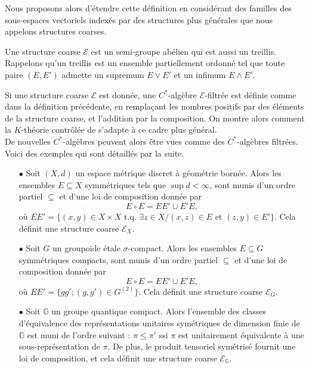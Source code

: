 Nous proposons alors d'étendre cette définition en considérant des familles des sous-espaces vectoriels indexés par des structures plus générales que nous appelons structures coarses. 

\begin{definitionfr}
Une structure coarse $\mathcal E$ est un semi-groupe abélien qui est aussi un treillis. %
Rappelons qu'un treillis est un ensemble partiellement ordonné tel que toute paire $(E,E')$ admette un supremum $E\vee E'$ et un infimum $E\wedge E'$.
\end{definitionfr}

Si une structure coarse $\mathcal E$ est donnée, une $C^*$-algèbre $\mathcal E$-filtrée est définie comme dans la définition précédente, en remplaçant les nombres positifs par des éléments de la structure coarse, et l'addition par la composition. On montre alors comment la $K$-théorie contrôlée de \cite{OY2} s'adapte à ce cadre plus général.\\

De nouvelles $C^*$-algèbres peuvent alors être vues comme des $C^*$-algèbres filtrées. Voici des exemples qui sont détaillés par la suite.
\begin{itemize} 
\item[$\bullet$] Soit $(X,d)$ un espace métrique discret à géométrie bornée. Alors les ensembles $E\subseteq X$ symmétriques tels que $\sup d<\infty$, sont munis d'un ordre partiel $\subseteq$ et d'une loi de composition donnée par 
\[E\circ E = EE'\cup E'E,\]
où $EE' = \{(x,y)\in X\times X \text{ t.q. }\exists z\in X / (x,z)\in E \text{ et }(z,y)\in E'\}$. Cela définit une structure coarse $\mathcal E_X$.
\item[$\bullet$] Soit $G$ un groupoïde étale $\sigma$-compact. Alors les ensembles $E\subseteq G$ symmétriques compacts, sont munis d'un ordre partiel $\subseteq$ et d'une loi de composition donnée par 
\[E\circ E = EE'\cup E'E,\]
où $EE' = \{gg' ; (g,g')\in G^{(2)}\}$. Cela définit une structure coarse $\mathcal E_G$.
\item[$\bullet$] Soit $\mathbb G$ un groupe quantique compact. Alors l'ensemble des classes d'équivalence des représentations unitaires symétriques de dimension finie de $\mathbb G$ est muni de l'ordre suivant : $\pi\leq \pi'$ ssi $\pi$ est unitairement équivalente à une sous-représentation de $\pi$. De plus, le produit tensoriel symétrisé fournit une loi de composition, et cela définit une structure coarse $\mathcal E_{\mathbb G}$.\\
\end{itemize} 

